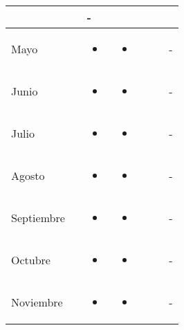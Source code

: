 \documentclass[landscape, a4paper, 10pt]{article}
\newcommand{\smallcellwidth}{0.7in}
\newcommand{\normalcellwidth}{1.2in}
\newcommand{\bigcellwidth}{2.0in}
\begin{document}
\begin{longtable}{|m{\smallcellwidth}|p{\normalcellwidth}|p{\bigcellwidth}|p{\bigcellwidth}|p{\normalcellwidth}|p{\normalcellwidth}|p{\normalcellwidth}|}
		  &
		  &
		 - \\
		\hline
		Mayo &
		 &
		\begin{itemize}
			\item 
		\end{itemize} &
		\begin{itemize}
			\item 
		\end{itemize} &
		  &
		  &
		 - \\
		\hline
		Junio &
		 &
		\begin{itemize}
			\item 
		\end{itemize} &
		\begin{itemize}
			\item 
		\end{itemize} &
		  &
		  &
		 - \\
		\hline
		Julio &
		 &
		\begin{itemize}
			\item 
		\end{itemize} &
		\begin{itemize}
			\item 
		\end{itemize} &
		  &
		  &
		 - \\
		\hline
		Agosto &
		 &
		\begin{itemize}
			\item 
		\end{itemize} &
		\begin{itemize}
			\item 
		\end{itemize} &
		  &
		  &
		 - \\
		\hline
		Septiembre &
		 &
		\begin{itemize}
			\item 
		\end{itemize} &
		\begin{itemize}
			\item 
		\end{itemize} &
		  &
		  &
		 - \\
		\hline
		Octubre &
		 &
		\begin{itemize}
			\item 
		\end{itemize} &
		\begin{itemize}
			\item 
		\end{itemize} &
		  &
		  &
		 - \\
		\hline
		Noviembre &
		 &
		\begin{itemize}
			\item 
		\end{itemize} &
		\begin{itemize}
			\item 
		\end{itemize} &
		  &
		  &
		 - \\
		\hline

	\end{longtable}
\end{document}

